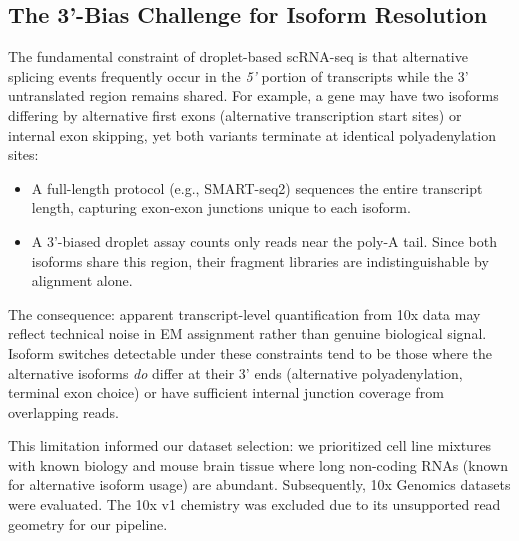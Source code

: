 \subsection*{The 3'-Bias Challenge for Isoform Resolution}
The fundamental constraint of droplet-based scRNA-seq is that alternative splicing events frequently occur in the \textit{5'} portion of transcripts while the 3' untranslated region remains shared. For example, a gene may have two isoforms differing by alternative first exons (alternative transcription start sites) or internal exon skipping, yet both variants terminate at identical polyadenylation sites:
\begin{itemize}
    \item A full-length protocol (e.g., SMART-seq2) sequences the entire transcript length, capturing exon-exon junctions unique to each isoform.
    \item A 3'-biased droplet assay counts only reads near the poly-A tail. Since both isoforms share this region, their fragment libraries are indistinguishable by alignment alone.
\end{itemize}
The consequence: apparent transcript-level quantification from 10x data may reflect technical noise in EM assignment rather than genuine biological signal. Isoform switches detectable under these constraints tend to be those where the alternative isoforms \textit{do} differ at their 3' ends (alternative polyadenylation, terminal exon choice) or have sufficient internal junction coverage from overlapping reads.

This limitation informed our dataset selection: we prioritized cell line mixtures with known biology and mouse brain tissue where long non-coding RNAs (known for alternative isoform usage) are abundant. Subsequently, 10x Genomics datasets were evaluated. The 10x v1 chemistry was excluded due to its unsupported read geometry for our pipeline. 

